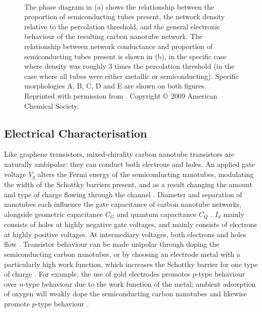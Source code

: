 \documentclass[
  a4paper,
]{scrbook}
\begin{document}
\begin{figure}
\begin{minipage}[t]{0.40\linewidth}
{}

\end{minipage}%
%
\begin{minipage}[t]{0.01\linewidth}

{\centering 

~

}

\end{minipage}%

\caption[Figures showing the relationship between the proportion of
semiconducting tubes present, the network density relative to the
percolation threshold, and the general electronic behaviour of the
resulting carbon nanotube network.]{\label{fig-m-s-junctions}The phase
diagram in (a) shows the relationship between the proportion of
semiconducting tubes present, the network density relative to the
percolation threshold, and the general electronic behaviour of the
resulting carbon nanotube network. The relationship between network
conductance and proportion of semiconducting tubes present is shown in
(b), in the specific case where density was roughly 3 times the
percolation threshold (in the case where all tubes were either metallic
or semiconducting). Specific morphologies A, B, C, D and E are shown on
both figures. Reprinted with permission from \autocite{Topinka2009}.
Copyright \(\copyright\) 2009 American Chemical Society.}

\end{figure}

\hypertarget{sec-electrical-characterisation-CNT}{%
\subsection{Electrical
Characterisation}\label{sec-electrical-characterisation-CNT}}

Like graphene transistors, mixed-chirality carbon nanotube transistors
are naturally ambipolar: they can conduct both electrons and holes. An
applied gate voltage \(V_g\) alters the Fermi energy of the
semiconducting nanotubes, modulating the width of the Schottky barriers
present, and as a result changing the amount and type of charge flowing
through the channel \autocite{Nakanishi2002,Kauffman2008,Heller2008}.
Diameter and separation of nanotubes each influence the gate capacitance
of carbon nanotube networks, alongside geometric capacitance \(C_{G}\)
and quantum capacitance \(C_{Q}\) \autocite{Rouhi2011a}. \(I_d\) mainly
consists of holes at highly negative gate voltages, and mainly consists
of electrons at highly positive voltages. At intermediary voltages, both
electrons and holes flow \autocite{Avouris2007,Yao2021}. Transistor
behaviour can be made unipolar through doping the semiconducting carbon
nanotubes, or by choosing an electrode metal with a particularly high
work function, which increases the Schottky barrier for one type of
charge \autocite{Avouris2007,Kauffman2008,Cao2009,Yao2021}. For example,
the use of gold electrodes promotes \(p\)-type behaviour over \(n\)-type
behaviour due to the work function of the metal; ambient adsorption of
oxygen will weakly dope the semiconducting carbon nanotubes and likewise
promote \(p\)-type behaviour
\autocite{McEuen2002,Kauffman2008,Cao2009,Shkodra2021}.
\end{document}
